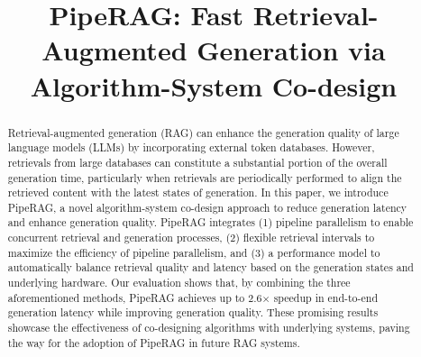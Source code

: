 \title{\large PipeRAG: Fast Retrieval-Augmented Generation via Algorithm-System Co-design}




\printAffiliationsAndNotice{}  %
\def\thefootnote{$^\dagger$}\def\thefootnote{\arabic{footnote}}
\begin{abstract}
Retrieval-augmented generation (RAG) can enhance the generation quality of large language models (LLMs) by incorporating external token databases. However, retrievals from large databases can constitute a substantial portion of the overall generation time, particularly when retrievals are periodically performed to align the retrieved content with the latest states of generation.
In this paper, we introduce PipeRAG, a novel algorithm-system co-design approach to reduce generation latency and enhance generation quality.
PipeRAG integrates (1) pipeline parallelism to enable concurrent retrieval and generation processes, (2) flexible retrieval intervals to maximize the efficiency of pipeline parallelism, and (3) a performance model to automatically balance retrieval quality and latency based on the generation states and underlying hardware.
Our evaluation shows that, by combining the three aforementioned methods, PipeRAG achieves up to 2.6$\times$ speedup in end-to-end generation latency while improving generation quality. These promising results showcase the effectiveness of co-designing algorithms with underlying systems, paving the way for the adoption of PipeRAG in future RAG systems.

\end{abstract}

